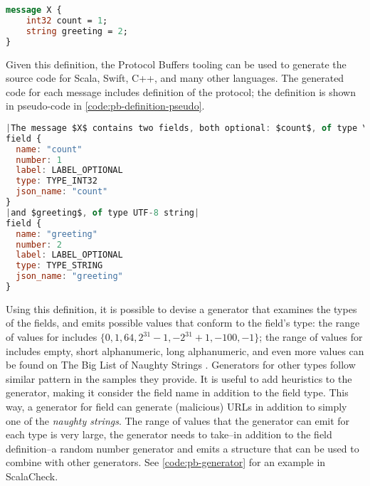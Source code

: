 \begin{lstlisting}[caption={Trivial protocol definition}, label={code:pb-example}, language=Protobuf]
message X {
    int32 count = 1;
    string greeting = 2; 
}
\end{lstlisting}

Given this definition, the Protocol Buffers tooling can be used to generate the source code for Scala, Swift, C++, and many other languages. The generated code for each message includes definition of the protocol; the definition is shown in pseudo-code in \autoref{code:pb-definition-pseudo}.

\begin{lstlisting}[caption={Trivial protocol definition}, label={code:pb-definition-pseudo}, language=JavaScript, escapechar=|]
|The message $X$ contains two fields, both optional: $count$, of type \SI{32}{\bit} signed integer|
field {
  name: "count"
  number: 1
  label: LABEL_OPTIONAL
  type: TYPE_INT32
  json_name: "count"
}
|and $greeting$, of type UTF-8 string|
field {
  name: "greeting"
  number: 2
  label: LABEL_OPTIONAL
  type: TYPE_STRING
  json_name: "greeting"
}
\end{lstlisting}

Using this definition, it is possible to devise a generator that examines the types of the fields, and emits possible values that conform to the field's type: the range of values for  includes $\{0, 1, 64, 2^{31}-1, -2^{31}+1, -100, -1\}$; the range of values for  includes empty, short alphanumeric, long alphanumeric, and even more values can be found on The Big List of Naughty Strings \cite{blns}. Generators for other types follow similar pattern in the samples they provide. It is useful to add heuristics to the generator, making it consider the field name in addition to the field type. This way, a generator for field  can generate (malicious) URLs in addition to simply one of the \emph{naughty strings}. The range of values that the generator can emit for each type is very large, the generator needs to take--in addition to the field definition--a random number generator and emits a structure that can be used to combine with other generators. See \autoref{code:pb-generator} for an example in ScalaCheck.

